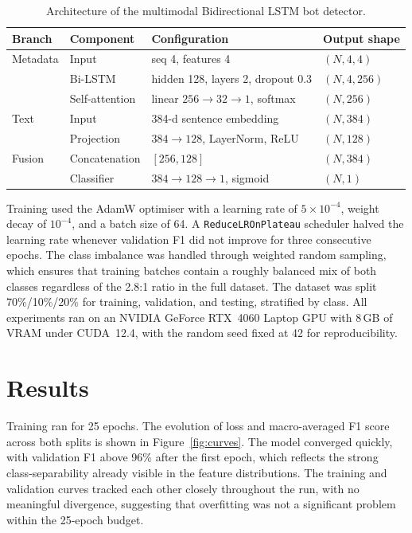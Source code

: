 \begin{table}[h]
\centering
\small
\caption{Architecture of the multimodal Bidirectional LSTM bot detector.}
\label{tab:arch}
\begin{tabular}{llll}
\hline
\textbf{Branch} & \textbf{Component} & \textbf{Configuration} & \textbf{Output shape} \\
\hline
Metadata & Input           & seq 4, features 4         & $(N, 4, 4)$   \\
         & Bi-LSTM         & hidden 128, layers 2, dropout 0.3 & $(N, 4, 256)$ \\
         & Self-attention  & linear $256 \to 32 \to 1$, softmax & $(N, 256)$  \\
\hline
Text     & Input           & 384-d sentence embedding  & $(N, 384)$   \\
         & Projection      & $384 \to 128$, LayerNorm, ReLU & $(N, 128)$ \\
\hline
Fusion   & Concatenation   & $[256, 128]$              & $(N, 384)$   \\
         & Classifier      & $384 \to 128 \to 1$, sigmoid & $(N, 1)$   \\
\hline
\end{tabular}
\end{table}

Training used the AdamW optimiser with a learning rate of $5 \times 10^{-4}$,
weight decay of $10^{-4}$, and a batch size of 64. A \texttt{ReduceLROnPlateau}
scheduler halved the learning rate whenever validation F1 did not improve for
three consecutive epochs. The class imbalance was handled through weighted
random sampling, which ensures that training batches contain a roughly balanced
mix of both classes regardless of the 2.8:1 ratio in the full dataset. The
dataset was split 70\%/10\%/20\% for training, validation, and testing,
stratified by class. All experiments ran on an NVIDIA GeForce RTX~4060 Laptop
GPU with 8\,GB of VRAM under CUDA~12.4, with the random seed fixed at 42
for reproducibility.

\section{Results}
\label{sec:results}

Training ran for 25 epochs. The evolution of loss and macro-averaged F1 score
across both splits is shown in Figure~\ref{fig:curves}. The model converged
quickly, with validation F1 above 96\% after the first epoch, which reflects
the strong class-separability already visible in the feature distributions.
The training and validation curves tracked each other closely throughout the
run, with no meaningful divergence, suggesting that overfitting was not a
significant problem within the 25-epoch budget.

